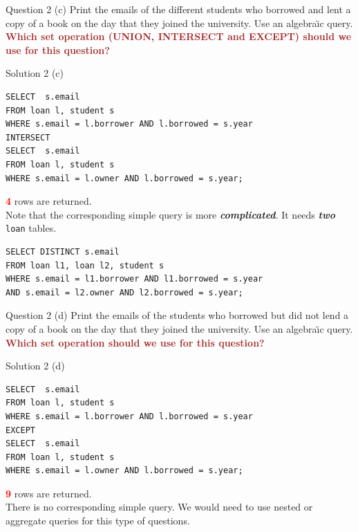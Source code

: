 \begin{frame}[fragile]{Question 2 (c)}
Print the emails of the different students who borrowed and lent a copy of a book on the day that they joined the university. Use an algebra\"{\i}c query.\\
\vspace{10pt}
\textcolor{brown}{\textbf{Which set operation (UNION, INTERSECT and EXCEPT) should we use for this question?}}
\end{frame}

\begin{frame}[fragile]{Solution 2 (c)}
\begin{lstlisting}
SELECT  s.email 
FROM loan l, student s 
WHERE s.email = l.borrower AND l.borrowed = s.year
INTERSECT
SELECT  s.email 
FROM loan l, student s 
WHERE s.email = l.owner AND l.borrowed = s.year;
\end{lstlisting}
\vspace{5pt}
\textcolor{red}{\textbf{4}} rows are returned.\\
\vspace{10pt}
Note that the corresponding simple query is more \textit{\textbf{complicated}}. It needs \textbf{\textit{two}} \texttt{loan} tables.

\begin{lstlisting}
SELECT DISTINCT s.email 
FROM loan l1, loan l2, student s 
WHERE s.email = l1.borrower AND l1.borrowed = s.year 
AND s.email = l2.owner AND l2.borrowed = s.year;
\end{lstlisting}
\end{frame}

\begin{frame}[fragile]{Question 2 (d)}
Print the emails of the students who borrowed but did not lend a copy of a book on the day that they joined the university. Use an algebra\"{\i}c query.\\
\vspace{10pt}
\textcolor{brown}{\textbf{Which set operation should we use for this question?}}
\end{frame}

\begin{frame}[fragile]{Solution 2 (d)}
\begin{lstlisting}
SELECT  s.email 
FROM loan l, student s 
WHERE s.email = l.borrower AND l.borrowed = s.year
EXCEPT
SELECT  s.email 
FROM loan l, student s 
WHERE s.email = l.owner AND l.borrowed = s.year;
\end{lstlisting}

\vspace{5pt}
\textcolor{red}{\textbf{9}} rows are returned.\\
\vspace{10pt}
There is no corresponding simple query. We would need to use nested or aggregate queries for this type of questions.
\end{frame}

